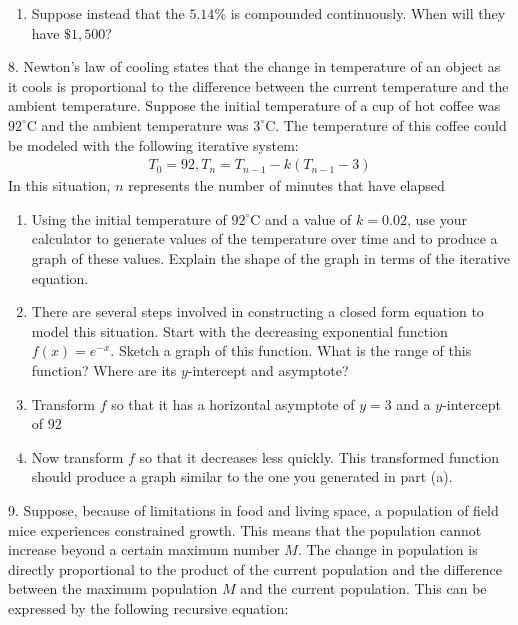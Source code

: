 \documentclass[10pt,]{book}
\theoremstyle{plain}
\theoremstyle{definition}
\theoremstyle{definition}
\theoremstyle{definition}
\numberwithin{equation}{section}
\begin{document}
\begin{exerciselist}
\begin{enumerate}[label=(\alph*)]
\item\hypertarget{li-149}{}Suppose instead that the \(5.14\%\) is compounded continuously. When will they have \(\$1,500\)?%
\end{enumerate}
\par\smallskip
\item[8.]\hypertarget{exercise-69}{}\hypertarget{p-265}{}%
Newton's law of cooling states that the change in temperature of an object as it cools is proportional to the difference between the current temperature and the ambient temperature.  Suppose the initial temperature of a cup of hot coffee was \(92^\circ\)C and the ambient temperature was \(3^\circ\)C.  The temperature of this coffee could be modeled with the following iterative system:%
%
\begin{gather*}
T_0 = 92,  T_n = T_{n-1} - k \left( T_{n-1} - 3 \right)
\end{gather*}
\hypertarget{p-266}{}%
In this situation, \(n\) represents the number of minutes that have elapsed%
\leavevmode%
\begin{enumerate}[label=(\alph*)]
\item\hypertarget{li-150}{}Using the initial temperature of \(92^\circ\)C and a value of \(k = 0.02\), use your calculator to generate values of the temperature over time and to produce a graph of these values.  Explain the shape of the graph in terms of the iterative equation.%
\item\hypertarget{li-151}{}There are several steps involved in constructing a closed form equation to model this situation.  Start with the decreasing exponential function \(f(x) = e^{-x}\).  Sketch a graph of this function.  What is the range of this function?  Where are its \(y\)-intercept and asymptote?%
\item\hypertarget{li-152}{}Transform \(f\) so that it has a horizontal asymptote of \(y=3\) and a \(y\)-intercept of \(92\)%
\item\hypertarget{li-153}{}Now transform \(f\) so that it decreases less quickly. This transformed function should produce a graph similar to the one you generated in part (a).%
\end{enumerate}
\par\smallskip
\item[9.]\hypertarget{exercise-70}{}\hypertarget{p-267}{}%
Suppose, because of limitations in food and living space, a population of field mice experiences constrained growth. This means that the population cannot increase beyond a certain maximum number \(M\).  The change in population is directly proportional to the product of the current population and the difference between the maximum population \(M\) and the current population.  This can be expressed by the following recursive equation:%

\end{exerciselist}
\end{document}
